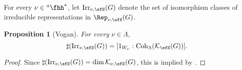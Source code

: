 \documentclass[12pt]{amsart}
\newcommand{\AV}{\mathrm{AV}}
\def\subset{\subseteq}
\newcommand{\CC}{{\mathcal {C}}}
\newcommand{\CK}{{\mathcal {K}}}
\newcommand{\CO}{{\mathcal {O}}}
\newcommand{\CU}{{\mathcal {U}}}
\DeclareMathOperator{\Ann}{Ann}
\newcommand{\g}{\mathfrak g}
\numberwithin{equation}{section}
\newtheorem{prop}[thm]{Proposition}
\theoremstyle{remark}
\def\Irr{\mathrm{Irr}}
\def\hha{{}^a\fhh}
\def\Coh{\mathrm{Coh}}
\begin{document}
For every $\nu\in \hha^*$, let $\Irr_{\nu,\sfS}(G)$ denote the set of isomorphism classes of irreducible representations in $\Rep_{\nu, \sfS}(G)$.


\begin{prop}[Vogan]\label{count1}
 For every $\nu\in \Lambda$,
  \[
    \sharp(\Irr_{\nu,\sfS}(G)) = [1_{W_{\nu}}:\Coh_{\Lambda}(\CK_\sfS(G))].
  \]

\end{prop}
\begin{proof}
Since $ \sharp(\Irr_{\nu,\sfS}(G))=\dim \CK_{\nu, \sfS}(G)$, this is implied by .
\end{proof}







\end{document}
